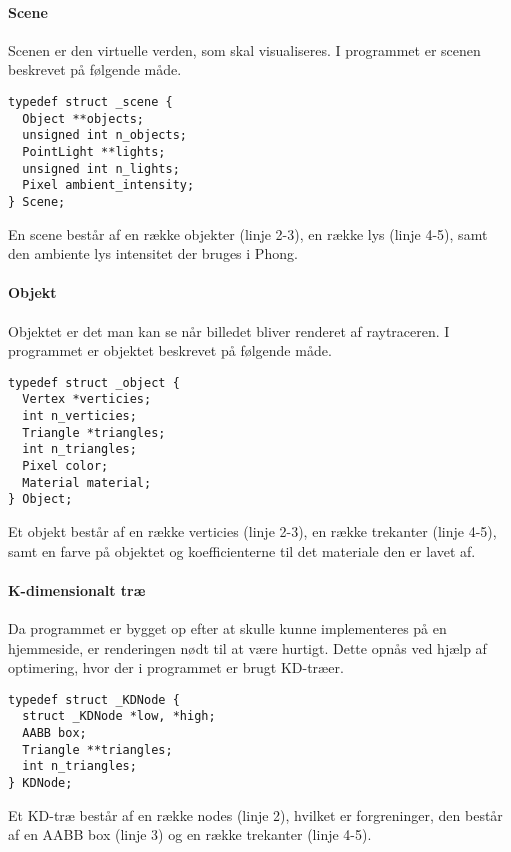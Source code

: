 \paragraph{Scene}
Scenen er den virtuelle verden, som skal visualiseres. I programmet er scenen beskrevet på følgende måde. 

\begin{lstlisting}[style=Cstyle, caption=Struct til scene]
typedef struct _scene {
  Object **objects;
  unsigned int n_objects;
  PointLight **lights;
  unsigned int n_lights;
  Pixel ambient_intensity;
} Scene; 
\end{lstlisting}

En scene består af en række objekter (linje 2-3), en række lys (linje 4-5), samt den ambiente lys intensitet der bruges i Phong.

\paragraph{Objekt}
Objektet er det man kan se når billedet bliver renderet af raytraceren. I programmet er objektet beskrevet på følgende måde.

\begin{lstlisting}[style=Cstyle, caption=Structs til objektet]
typedef struct _object {
  Vertex *verticies;
  int n_verticies;
  Triangle *triangles;
  int n_triangles;
  Pixel color;
  Material material;
} Object;
\end{lstlisting}

Et objekt består af en række verticies (linje 2-3), en række trekanter (linje 4-5), samt en farve på objektet og koefficienterne til det materiale den er lavet af.
\paragraph{K-dimensionalt træ}
Da programmet er bygget op efter at skulle kunne implementeres på en hjemmeside, er renderingen nødt til at være hurtigt. Dette opnås ved hjælp af optimering, hvor der i programmet er brugt KD-træer.

\begin{lstlisting}[style=Cstyle, caption=Struct til KDNode]
typedef struct _KDNode {
  struct _KDNode *low, *high;
  AABB box;
  Triangle **triangles;
  int n_triangles;
} KDNode;
\end{lstlisting}

Et KD-træ består af en række nodes (linje 2), hvilket er forgreninger, den består af en AABB box (linje 3) og en række trekanter (linje 4-5).